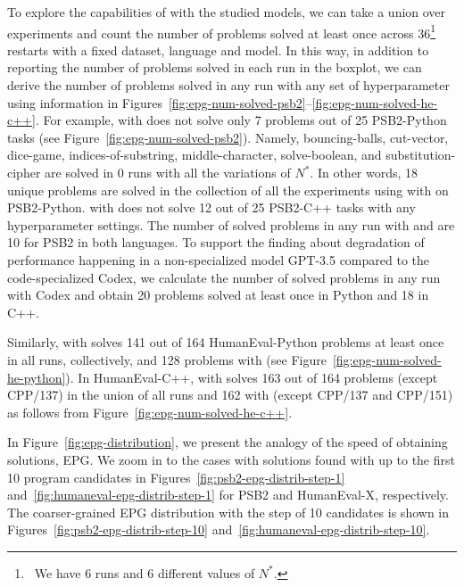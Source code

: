 
To explore the capabilities of \method{} with the studied models, we can take a union over experiments and count the number of problems solved at least once across 36\footnote{~We have 6 runs and 6 different values of $N^*.$} restarts with a fixed dataset, language and model.
In this way, in addition to reporting the number of problems solved in each run in the boxplot, we can derive the number of problems solved in any run with any set of hyperparameter using information in Figures~\ref{fig:epg-num-solved-psb2}--\ref{fig:epg-num-solved-he-c++}.
For example, \method{} with \gpt{} does not solve only 7 problems out of 25 PSB2-Python tasks (see Figure~\ref{fig:epg-num-solved-psb2}).
Namely, bouncing-balls, cut-vector, dice-game, indices-of-substring, middle-character, solve-boolean, and substitution-cipher are solved in 0 runs with all the variations of $N^*$.
In other words, 18 unique problems are solved in the collection of all the experiments using \method{} with \gpt{} on PSB2-Python. 
\method{} with \gpt{} does not solve 12 out of 25 PSB2-C++ tasks with any hyperparameter settings. 
The number of solved problems in any run with \method{} and \llama{} are 10 for PSB2 in both languages. 
To support the finding about degradation of performance happening in a non-specialized model GPT-3.5 compared to the code-specialized Codex, we calculate the number of solved problems in any run with Codex and obtain 20 problems solved at least once in Python and 18 in C++. 

Similarly, \method{} with \gpt{} solves 141 out of 164 HumanEval-Python problems at least once in all runs, collectively, and 128 problems with \llama{} (see Figure~\ref{fig:epg-num-solved-he-python}).
In HumanEval-C++, \method{} with \gpt{} solves 163 out of 164 problems (except CPP/137) in the union of all runs and 162 with \llama{} (except CPP/137 and CPP/151) as follows from Figure~\ref{fig:epg-num-solved-he-c++}.


In Figure~\ref{fig:epg-distribution}, we present the analogy of the speed of obtaining solutions, EPG. 
We zoom in to the cases with solutions found with up to the first 10 program candidates in Figures~\ref{fig:psb2-epg-distrib-step-1} and~\ref{fig:humaneval-epg-distrib-step-1} for PSB2 and HumanEval-X, respectively. 
The coarser-grained EPG distribution with the step of 10 candidates is shown in Figures~\ref{fig:psb2-epg-distrib-step-10} and~\ref{fig:humaneval-epg-distrib-step-10}. 


